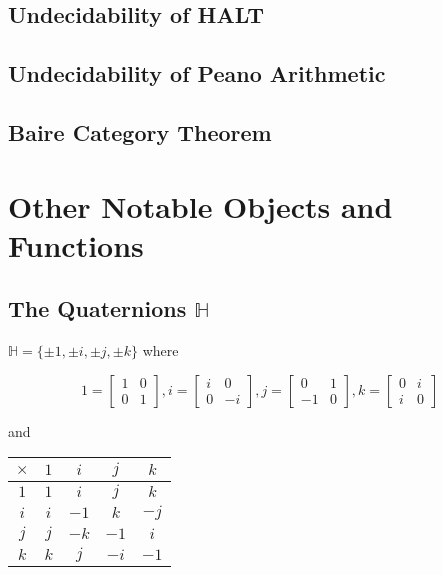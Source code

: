\subsection{Undecidability of HALT}

\subsection{Undecidability of Peano Arithmetic}

\subsection{Baire Category Theorem}

\section{Other Notable Objects and Functions}

	\subsection{The Quaternions $\mathbb{H}$}

	$\mathbb{H} = \{\pm 1, \pm i, \pm j, \pm k\}$ where

	$$
	1 = \begin{bmatrix}
	1 & 0\\
	0 & 1
	\end{bmatrix},
	i = \begin{bmatrix}
	i & 0\\
	0 & -i
	\end{bmatrix},
	j = \begin{bmatrix}
	 0 & 1\\
	-1 & 0
	\end{bmatrix},
	k = \begin{bmatrix}
	0 & i\\
	i & 0
	\end{bmatrix}
	$$

	and

	\begin{center}
	\begin{tabular}{|c|c|c|c|c|}
	\hline
	$\times$ & $1$ & $i$  & $j$  & $k$ \\ \hline
	$1$      & $1$ & $i$  & $j$  & $k$ \\ \hline
	$i$      & $i$ & $-1$ & $k$  & $-j$\\ \hline
	$j$      & $j$ & $-k$ & $-1$ & $i$ \\ \hline
	$k$      & $k$ & $j$  & $-i$ & $-1$\\ \hline
	\end{tabular}
	\end{center}

